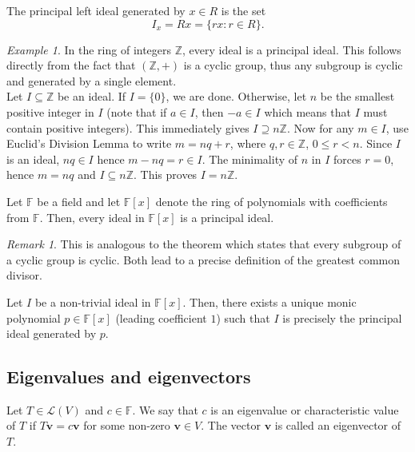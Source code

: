 \documentclass[11pt]{article}
\newcommand{\Z}{\mathbb{Z}}
\newcommand{\F}{\mathbb{F}}
\renewcommand{\vec}[1]{\boldsymbol{#1}}
\newcommand{\vv}{\vec{v}}
\newcommand{\alg}[1]{\mathscr{#1}}
\newcommand{\algL}{\alg{L}}
\theoremstyle{definition}
\theoremstyle{remark}
\newtheorem*{remark}{Remark}
\newtheorem*{example}{Example}
\numberwithin{equation}{section}
\begin{document}
    \begin{definition}
        The principal left ideal generated by $x \in R$ is the set \[
            I_x = Rx = \{rx: r \in R\}.
        \] 
    \end{definition}
    \begin{example}
        In the ring of integers $\Z$, every ideal is a principal ideal. This follows
        directly from the fact that $(\Z, +)$ is a cyclic group, thus any subgroup is
        cyclic and generated by a single element. \\

        Let $I \subseteq \Z$ be an ideal. If $I = \{0\}$, we are done. Otherwise, let
        $n$ be the smallest positive integer in $I$ (note that if $a \in I$, then $-a
        \in I$ which means that $I$ must contain positive integers). This immediately
        gives $I \supseteq n\Z$. Now for any $m \in I$, use Euclid's Division Lemma
        to write $m = nq + r$, where $q, r \in \Z$, $0 \leq r < n$. Since $I$ is an
        ideal, $nq \in I$ hence $m - nq = r \in I$.  The minimality of $n$ in $I$
        forces $r = 0$, hence $m = nq$ and $I \subseteq n\Z$. This proves $I = n\Z$.
    \end{example}

    \begin{theorem}
        Let $\F$ be a field and let $\F[x]$ denote the ring of polynomials with
        coefficients from $\F$. Then, every ideal in $\F[x]$ is a principal ideal.
        \begin{remark}
            This is analogous to the theorem which states that every subgroup of a
            cyclic group is cyclic. Both lead to a precise definition of the greatest
            common divisor.
        \end{remark}
    \end{theorem}
    \begin{corollary}
        Let $I$ be a non-trivial ideal in $\F[x]$. Then, there exists a unique monic
        polynomial $p \in \F[x]$ (leading coefficient $1$) such that $I$ is precisely
        the principal ideal generated by $p$.
    \end{corollary}

    \subsection{Eigenvalues and eigenvectors}
    \begin{definition}
        Let $T \in \algL(V)$ and $c \in \F$. We say that $c$ is an eigenvalue or
        characteristic value of $T$ if $T\vv = c\vv$ for some non-zero $\vv \in V$.
        The vector $\vv$ is called an eigenvector of $T$.
    \end{definition}
\end{document}
